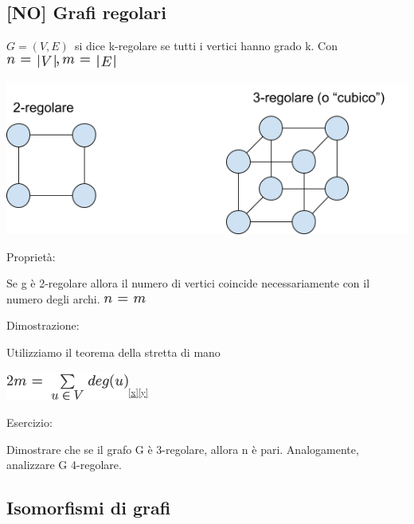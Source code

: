 \documentclass{article}
\begin{document}
{}

\hypertarget{h.m8b6lpkoqj6x}{\subsection{\texorpdfstring{{{[}NO{]} Grafi
regolari}}{{[}NO{]} Grafi regolari}}\label{h.m8b6lpkoqj6x}}

$G=(V,E)${~si dice k-regolare se tutti i
vertici hanno grado k. Con }\includegraphics{images/image423.png}

{}

{\includegraphics{images/image524.png}}

{}

{Proprietà}{: }

{Se g è 2-regolare allora il numero di vertici coincide necessariamente
con il numero degli archi. }\includegraphics{images/image424.png}

{}

{Dimostrazione}{: }

{Utilizziamo il teorema della stretta di mano}

\includegraphics{images/image425.png}\textsuperscript{\protect\hyperlink{cmnt24}{{[}x{]}}\protect\hyperlink{cmnt25}{{[}y{]}}}

{}

{Esercizio}{:}

{Dimostrare che se il grafo G è 3-regolare, allora n è pari.
Analogamente, analizzare G 4-regolare. }

{}

\hypertarget{h.d5v408sc7po0}{\subsection{\texorpdfstring{{Isomorfismi di
grafi}}{Isomorfismi di grafi}}\label{h.d5v408sc7po0}}
\end{document}
